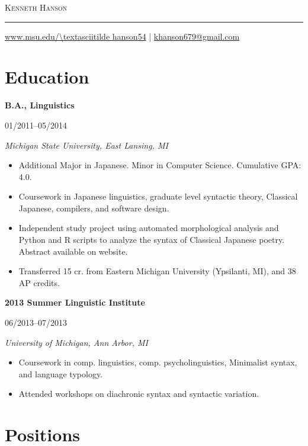 \documentclass[10pt,oneside]{article}
\makeatletter
\newcommand{\name}{Kenneth Hanson}
\newcommand{\email}{khanson679@gmail.com}
\newcommand{\website}{www.msu.edu/\textasciitilde hanson54}
\newcommand{\bigname}{%
	{\centering\scshape\Huge \name \par}
}
\newcommand{\contactinfo}{%
	{\raggedleft\small \url{\website} | \href{mailto:\email}{\email} \par}
}
\newcommand{\topheading}{%
	\bigname
	\rule{\textwidth}{1pt} \par
	\contactinfo
}
\newcommand{\ressection}[1]{
	\vspace{-12pt}
	\section*{#1}
}
\newcommand{\resbigitem}[4]{
	\item \parbox[t]{0.8\textwidth}{\textbf{#1}} \hfill #2 \\
		\parbox[t]{0.8\textwidth}{\textit{#3}} \hfill \textit{#4}
}
\makeatother
\begin{document}
\topheading

\ressection{Education}

\begin{reslist}
	\resbigitem{B.A., Linguistics}
		{01/2011--05/2014}
		{Michigan State University, East Lansing, MI}
		{}
	\begin{itemize}
		\item Additional Major in Japanese. Minor in Computer Science. Cumulative GPA: 4.0.
		\item Coursework in Japanese linguistics, graduate level syntactic theory, Classical Japanese, compilers, and software design.
		\item Independent study project using automated morphological analysis and Python and R scripts to analyze the syntax of Classical Japanese poetry. Abstract available on website.
		\item Transferred 15 cr. from Eastern Michigan University (Ypsilanti, MI), and 38 AP credits.
	\end{itemize}
	
	\resbigitem{2013 Summer Linguistic Institute}
		{06/2013--07/2013}
		{University of Michigan, Ann Arbor, MI}
		{}
	\begin{itemize}
		\item Coursework in comp. linguistics, comp. psycholinguistics, Minimalist syntax, and language typology.
		\item Attended workshops on diachronic syntax and syntactic variation.
	\end{itemize}
\end{reslist}


\ressection{Positions}
\end{document}
